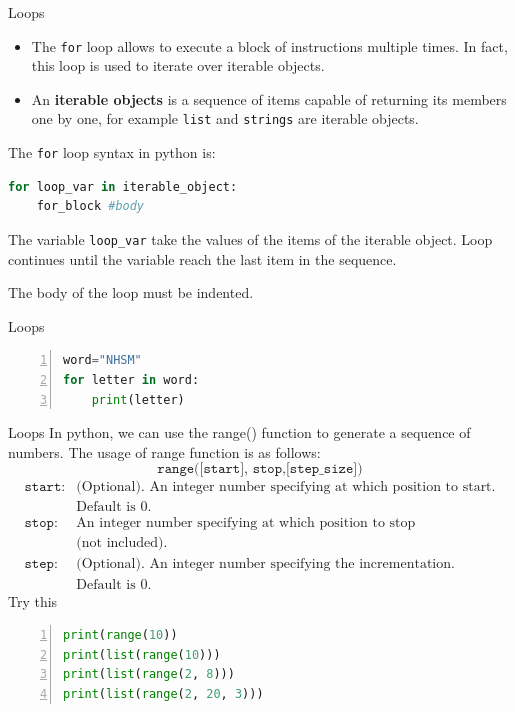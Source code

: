 \begin{frame}[fragile]{Loops}
    \begin{itemize}
        \item The \texttt{for} loop allows to execute a block of instructions multiple times. In fact, this loop is used to iterate over iterable objects.
        \item An {\bf iterable objects} is a sequence of items capable of returning its members one by one, for example \texttt{list} and \texttt{strings} are iterable objects.
    \end{itemize}
    The \texttt{for} loop  syntax in python is:
\begin{lstlisting}[showstringspaces=false,language=python]
for loop_var in iterable_object:
    for_block #body
\end{lstlisting}   
The variable \texttt{loop\_var} take the values of the items of the iterable object. Loop continues until the variable reach the last item in the sequence.


The body of the loop must be indented.
\end{frame}
\begin{frame}[fragile]{Loops}
\begin{lstlisting}[numbers=left,showstringspaces=false,language=python]
word="NHSM"
for letter in word:
    print(letter)
\end{lstlisting}        
\end{frame}
\begin{frame}[fragile]{Loops}
    In python, we can use the {range()} function to generate a sequence of numbers.
    \pause
    The usage of range function is as follows:
        $$\texttt{range([start], stop,[step\_size])}$$
\begin{align*}
    \texttt{start}: &\text{(Optional). An integer number specifying at which position to start.}\\ 
                    &\text{Default is 0.}\\
    \texttt{stop}:&\text{An integer number specifying at which position to stop}\\
                  & \text{(not included).}\\
    \texttt{step}:&\text{(Optional). An integer number specifying the incrementation.}\\
                  &\text{Default is 0.}
\end{align*}
\pause
    Try this
    \begin{lstlisting}[numbers=left,showstringspaces=false,language=python]
print(range(10))
print(list(range(10)))
print(list(range(2, 8)))
print(list(range(2, 20, 3)))
    \end{lstlisting}        
\end{frame}
